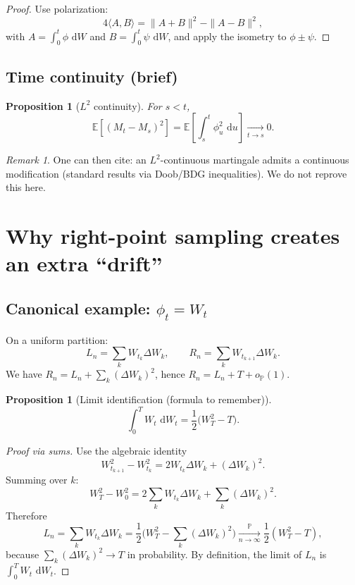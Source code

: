 \documentclass[11pt]{article}
\newcommand{\Pbb}{\mathbb{P}}
\newcommand{\E}{\mathbb{E}}
\newcommand{\1}{\mathbf{1}}
\newcommand{\dd}{\,\mathrm{d}}
\numberwithin{equation}{section}
\theoremstyle{plain}
\newtheorem{proposition}[theorem]{Proposition}
\theoremstyle{definition}
\theoremstyle{remark}
\newtheorem{remark}[theorem]{Remark}
\begin{document}
\begin{proof}
Use polarization:
\[
4\langle A,B\rangle = \|A+B\|^2-\|A-B\|^2,
\]
with $A=\int_0^t\phi\,\dd W$ and $B=\int_0^t\psi\,\dd W$, and apply the isometry to $\phi\pm\psi$.
\end{proof}

\subsection{Time continuity (brief)}

\begin{proposition}[$L^2$ continuity]
For $s<t$,
\[
\E[(M_t-M_s)^2]=\E\!\left[\int_s^t \phi_u^2\,\dd u\right]\xrightarrow[t\to s]{}0.
\]
\end{proposition}

\begin{remark}
One can then cite: an $L^2$-continuous martingale admits a continuous modification
(standard results via Doob/BDG inequalities). We do not reprove this here.
\end{remark}

\section{Why right-point sampling creates an extra ``drift''}

\subsection{Canonical example: $\phi_t=W_t$}

On a uniform partition:
\[
L_n=\sum_k W_{t_k}\Delta W_k,\qquad
R_n=\sum_k W_{t_{k+1}}\Delta W_k.
\]
We have $R_n=L_n+\sum_k(\Delta W_k)^2$, hence $R_n=L_n+T+o_{\Pbb}(1)$.

\begin{proposition}[Limit identification (formula to remember)]
\[
\int_0^T W_t\,\dd W_t=\frac12\big(W_T^2-T\big).
\]
\end{proposition}

\begin{proof}[Proof via sums]
Use the algebraic identity
\[
W_{t_{k+1}}^2-W_{t_k}^2
=2W_{t_k}\Delta W_k+(\Delta W_k)^2.
\]
Summing over $k$:
\[
W_T^2-W_0^2=2\sum_k W_{t_k}\Delta W_k+\sum_k(\Delta W_k)^2.
\]
Therefore
\[
L_n=\sum_k W_{t_k}\Delta W_k
=\frac12\Big(W_T^2-\sum_k(\Delta W_k)^2\Big)
\xrightarrow[n\to\infty]{\Pbb}\frac12(W_T^2-T),
\]
because $\sum_k(\Delta W_k)^2\to T$ in probability.
By definition, the limit of $L_n$ is $\int_0^T W_t\,\dd W_t$.
\end{proof}
\end{document}
